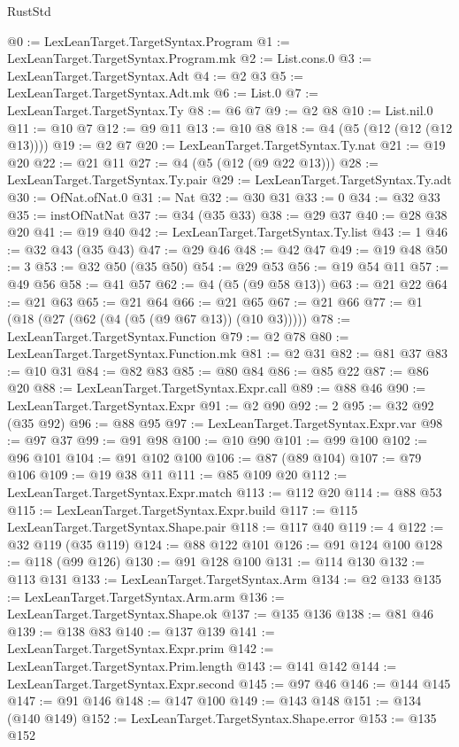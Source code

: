 \begin{lexlean}{RustStd}
\begin{coremodule}
{\begin{coremodule}
{{{{{{{{{{{{{{{{{{{{{{{{{{{{{{{{@0 := LexLeanTarget.TargetSyntax.Program
@1 := LexLeanTarget.TargetSyntax.Program.mk
@2 := List.cons.{0}
@3 := LexLeanTarget.TargetSyntax.Adt
@4 := @2 @3
@5 := LexLeanTarget.TargetSyntax.Adt.mk
@6 := List.{0}
@7 := LexLeanTarget.TargetSyntax.Ty
@8 := @6 @7
@9 := @2 @8
@10 := List.nil.{0}
@11 := @10 @7
@12 := @9 @11
@13 := @10 @8
@18 := @4 (@5 (@12 (@12 (@12 @13))))
@19 := @2 @7
@20 := LexLeanTarget.TargetSyntax.Ty.nat
@21 := @19 @20
@22 := @21 @11
@27 := @4 (@5 (@12 (@9 @22 @13)))
@28 := LexLeanTarget.TargetSyntax.Ty.pair
@29 := LexLeanTarget.TargetSyntax.Ty.adt
@30 := OfNat.ofNat.{0}
@31 := Nat
@32 := @30 @31
@33 := 0
@34 := @32 @33
@35 := instOfNatNat
@37 := @34 (@35 @33)
@38 := @29 @37
@40 := @28 @38 @20
@41 := @19 @40
@42 := LexLeanTarget.TargetSyntax.Ty.list
@43 := 1
@46 := @32 @43 (@35 @43)
@47 := @29 @46
@48 := @42 @47
@49 := @19 @48
@50 := 3
@53 := @32 @50 (@35 @50)
@54 := @29 @53
@56 := @19 @54 @11
@57 := @49 @56
@58 := @41 @57
@62 := @4 (@5 (@9 @58 @13))
@63 := @21 @22
@64 := @21 @63
@65 := @21 @64
@66 := @21 @65
@67 := @21 @66
@77 := @1 (@18 (@27 (@62 (@4 (@5 (@9 @67 @13)) (@10 @3)))))
@78 := LexLeanTarget.TargetSyntax.Function
@79 := @2 @78
@80 := LexLeanTarget.TargetSyntax.Function.mk
@81 := @2 @31
@82 := @81 @37
@83 := @10 @31
@84 := @82 @83
@85 := @80 @84
@86 := @85 @22
@87 := @86 @20
@88 := LexLeanTarget.TargetSyntax.Expr.call
@89 := @88 @46
@90 := LexLeanTarget.TargetSyntax.Expr
@91 := @2 @90
@92 := 2
@95 := @32 @92 (@35 @92)
@96 := @88 @95
@97 := LexLeanTarget.TargetSyntax.Expr.var
@98 := @97 @37
@99 := @91 @98
@100 := @10 @90
@101 := @99 @100
@102 := @96 @101
@104 := @91 @102 @100
@106 := @87 (@89 @104)
@107 := @79 @106
@109 := @19 @38 @11
@111 := @85 @109 @20
@112 := LexLeanTarget.TargetSyntax.Expr.match
@113 := @112 @20
@114 := @88 @53
@115 := LexLeanTarget.TargetSyntax.Expr.build
@117 := @115 LexLeanTarget.TargetSyntax.Shape.pair
@118 := @117 @40
@119 := 4
@122 := @32 @119 (@35 @119)
@124 := @88 @122 @101
@126 := @91 @124 @100
@128 := @118 (@99 @126)
@130 := @91 @128 @100
@131 := @114 @130
@132 := @113 @131
@133 := LexLeanTarget.TargetSyntax.Arm
@134 := @2 @133
@135 := LexLeanTarget.TargetSyntax.Arm.arm
@136 := LexLeanTarget.TargetSyntax.Shape.ok
@137 := @135 @136
@138 := @81 @46
@139 := @138 @83
@140 := @137 @139
@141 := LexLeanTarget.TargetSyntax.Expr.prim
@142 := LexLeanTarget.TargetSyntax.Prim.length
@143 := @141 @142
@144 := LexLeanTarget.TargetSyntax.Expr.second
@145 := @97 @46
@146 := @144 @145
@147 := @91 @146
@148 := @147 @100
@149 := @143 @148
@151 := @134 (@140 @149)
@152 := LexLeanTarget.TargetSyntax.Shape.error
@153 := @135 @152
}}}}}}}}}}}}}}}}}}}}}}}}}}}}}}}}
\end{coremodule}}
\end{coremodule}
\end{lexlean}
